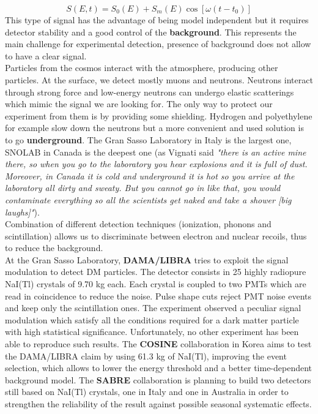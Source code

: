 \documentclass[10.75pt,a4paper,openright,bottom=2cm]{article}
\begin{document}
\[
S(E,t)=S_0(E)+S_m(E)\cos[\omega(t-t_0)]
\]
This type of signal has the advantage of being model independent but it requires detector stability and a good control of the \textbf{background}. This represents the main challenge for experimental detection, presence of background does not allow to have a clear signal.\\
Particles from the cosmos interact with the atmosphere, producing other particles. At the surface, we detect mostly muons and neutrons. Neutrons interact through strong force and low-energy neutrons can undergo elastic scatterings which mimic the signal we are looking for. The only way to protect our experiment from them is by providing some shielding. Hydrogen and polyethylene for example slow down the neutrons but a more convenient and used solution is to go \textbf{underground}. The Gran Sasso Laboratory in Italy is the largest one, SNOLAB in Canada is the deepest one (as Vignati said \textit{"there is an active mine there, so when you go to the laboratory you hear explosions and it is full of dust. Moreover, in Canada it is cold and underground it is hot so you arrive at the laboratory all dirty and sweaty. But you cannot go in like that, you would contaminate everything so all the scientists get naked and take a shower [big laughs]"}).\\
Combination of different detection techniques (ionization, phonons and scintillation) allows us to discriminate between electron and nuclear recoils, thus to reduce the background.\\
At the Gran Sasso Laboratory, \textbf{DAMA/LIBRA} tries to exploit the signal modulation to detect DM particles. The detector consists in 25 highly radiopure NaI(Tl) crystals of 9.70 kg each. Each crystal is coupled to two PMTs which are read in coincidence to reduce the noise. Pulse shape cuts reject PMT noise events and keep only the scintillation ones. The experiment observed a peculiar signal modulation which satisfy all the conditions required for a dark matter particle with high statistical significance. Unfortunately, no other experiment has been able to reproduce such results. The \textbf{COSINE} collaboration in Korea aims to test the DAMA/LIBRA claim by using 61.3 kg of NaI(Tl), improving the event selection, which allows to lower the energy threshold and a better time-dependent background model. The \textbf{SABRE} collaboration is planning to build two detectors still based on NaI(Tl) crystals, one in Italy and one in Australia in order to strengthen the reliability of the result against possible seasonal systematic effects.\\
\end{document}
